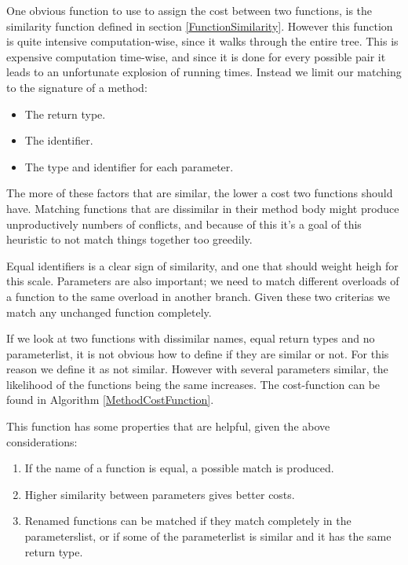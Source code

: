 \documentclass[11pt]{article}
\begin{document}
One obvious function to use to assign the cost between two functions, is the similarity function defined in section \ref{FunctionSimilarity}. However this function is quite intensive computation-wise, since it walks through the entire tree. This is expensive computation time-wise, and since it is done for every possible pair it leads to an unfortunate explosion of running times. Instead we limit our matching to the signature of a method:

\begin{itemize}
    \item The return type.
    \item The identifier.
    \item The type and identifier for each parameter.
\end{itemize}

The more of these factors that are similar, the lower a cost two functions should have. Matching functions that are dissimilar in their method body might produce unproductively numbers of conflicts, and because of this it's a goal of this heuristic to not match things together too greedily.

Equal identifiers is a clear sign of similarity, and one that should weight heigh for this scale. Parameters are also important; we need to match different overloads of a function to the same overload in another branch. Given these two criterias we match any unchanged function completely.

If we look at two functions with dissimilar names, equal return types and no parameterlist, it is not obvious how to define if they are similar or not. For this reason we define it as not similar. However with several parameters similar, the likelihood of the functions being the same increases.  The cost-function can be found in Algorithm \ref{MethodCostFunction}.

This function has some properties that are helpful, given the above considerations:

\begin{enumerate}
\item If the name of a function is equal, a possible match is produced.
\item Higher similarity between parameters gives better costs.
\item Renamed functions can be matched if they match completely in the parameterslist, or if some of the parameterlist is similar and it has the same return type.
\end{enumerate}
\end{document}
